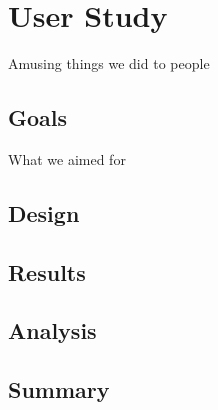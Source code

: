 \chapter{User Study}

Amusing things we did to people

\section{Goals}

What we aimed for

\section{Design}

\section{Results}

\section{Analysis}

\section{Summary}
